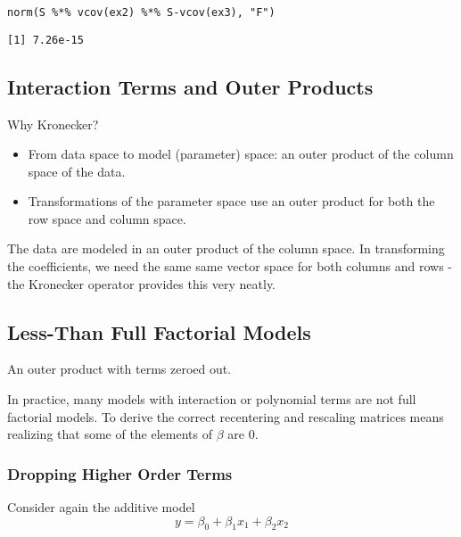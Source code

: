 \documentclass[]{article}
\providecommand{\tightlist}{%
  \setlength{\itemsep}{0pt}\setlength{\parskip}{0pt}}
\begin{document}
\begin{verbatim}
norm(S %*% vcov(ex2) %*% S-vcov(ex3), "F")
\end{verbatim}

\begin{verbatim}
[1] 7.26e-15
\end{verbatim}

\subsection{Interaction Terms and Outer
Products}\label{interaction-terms-and-outer-products}

Why Kronecker?

\begin{itemize}
\tightlist
\item
  From data space to model (parameter) space: an outer product of the
  column space of the data.
\item
  Transformations of the parameter space use an outer product for both
  the row space and column space.
\end{itemize}

The data are modeled in an outer product of the column space. In
transforming the coefficients, we need the same same vector space for
both columns and rows - the Kronecker operator provides this very
neatly.

\subsection{Less-Than Full Factorial
Models}\label{less-than-full-factorial-models}

An outer product with terms zeroed out.

In practice, many models with interaction or polynomial terms are not
full factorial models. To derive the correct recentering and rescaling
matrices means realizing that some of the elements of \(\beta\) are
\(0\).

\subsubsection{Dropping Higher Order
Terms}\label{dropping-higher-order-terms}

Consider again the additive model
\[y = \beta_0 + \beta_1x_1 + \beta_2x_2\]
\end{document}
